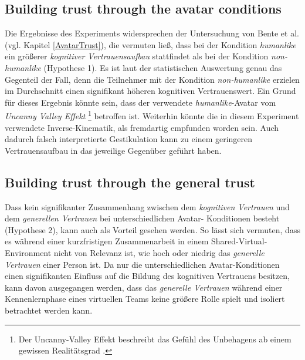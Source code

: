 \documentclass[sigchi]{acmart}
\begin{document}
\subsection{Building trust through the avatar conditions}
Die Ergebnisse des Experiments widersprechen der Untersuchung von Bente et al. (vgl. Kapitel \ref{AvatarTrust}), die vermuten ließ, dass bei der Kondition \textit{humanlike} ein größerer \textit{kognitiver Vertrauensaufbau} stattfindet als bei der Kondition \textit{non-humanlike} (Hypothese 1). Es ist laut der statistischen Auswertung genau das Gegenteil der Fall, denn die Teilnehmer mit der Kondition \textit{non-humanlike} erzielen im Durchschnitt einen signifikant höheren kognitiven Vertrauenswert.
Ein Grund für dieses Ergebnis könnte sein, dass der verwendete \textit{humanlike}-Avatar vom \textit{Uncanny Valley Effekt} \footnote{Der Uncanny-Valley Effekt beschreibt das Gefühl des Unbehagens ab einem gewissen Realitätsgrad  \citep[S. 352-353]{gast2011unheimliche}.} betroffen ist.
Weiterhin könnte die in diesem Experiment verwendete Inverse-Kinematik, als fremdartig empfunden worden sein. Auch dadurch falsch interpretierte Gestikulation kann zu einem geringeren Vertrauensaufbau in das jeweilige Gegenüber geführt haben.

\subsection{Building trust through the general trust}
Dass kein signifikanter Zusammenhang zwischen dem \textit{kognitiven Vertrauen} und dem \textit{generellen Vertrauen} bei unterschiedlichen Avatar- Konditionen besteht (Hypothese 2), kann auch als Vorteil gesehen werden.
So lässt sich vermuten, dass es während einer kurzfristigen Zusammenarbeit in einem Shared-Virtual-Environment nicht von Relevanz ist, wie hoch oder niedrig das \textit{generelle Vertrauen} einer Person ist. 
Da nur die unterschiedlichen Avatar-Konditionen einen signifikanten Einfluss auf die Bildung des kognitiven Vertrauens besitzen, kann davon ausgegangen werden, dass das \textit{generelle Vertrauen} während einer Kennenlernphase eines virtuellen Teams keine größere Rolle spielt und isoliert betrachtet werden kann.
\end{document}
